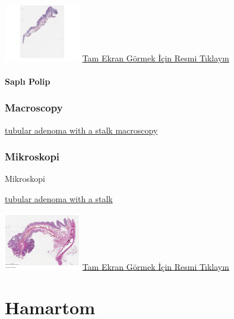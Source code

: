 \documentclass[
  letterpaper,
  DIV=11,
  numbers=noendperiod]{scrreprt}
\begin{document}
\href{https://images.patolojiatlasi.com/tubularadenoma-flat/HE2.html}{\includegraphics[width=0.25\textwidth,height=\textheight]{./screenshots/tubularadenoma-flat2_screenshot.png}}
\href{https://images.patolojiatlasi.com/tubularadenoma-flat/HE2.html}{Tam
Ekran Görmek İçin Resmi Tıklayın}

\hypertarget{sec-sapli-polip}{%
\subsubsection{Saplı Polip}\label{sec-sapli-polip}}

\hypertarget{macroscopy}{%
\subsection{Macroscopy}\label{macroscopy}}

\href{https://images.patolojiatlasi.com/tubularadenoma/tubular-adenoma-with-stalk-macroscopy.png}{tubular
adenoma with a stalk macroscopy}

\hypertarget{mikroskopi}{%
\subsection{Mikroskopi}\label{mikroskopi}}

Mikroskopi

\href{https://images.patolojiatlasi.com/tubularadenoma/tubular-adenoma-with-stalk.png}{tubular
adenoma with a stalk}

\href{https://images.patolojiatlasi.com/tubularadenoma/tubular-adenoma-with-stalk/viewer_z0.html}{\includegraphics[width=0.25\textwidth,height=\textheight]{./screenshots/tubular-adenoma-with-stalk_screenshot.png}}
\href{https://images.patolojiatlasi.com/tubularadenoma/tubular-adenoma-with-stalk/viewer_z0.html}{Tam
Ekran Görmek İçin Resmi Tıklayın}

\hypertarget{sec-hamartom}{%
\chapter{Hamartom}\label{sec-hamartom}}
\end{document}
